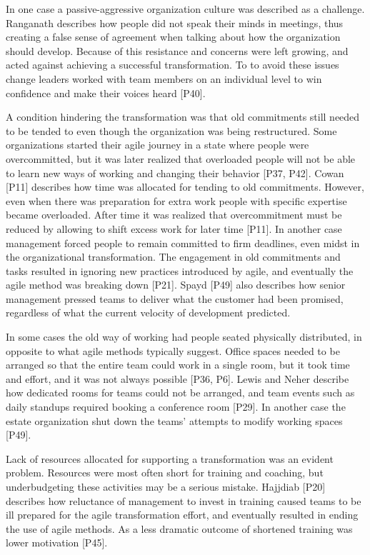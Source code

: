\documentclass[preprint,authoryear,12pt]{elsarticle}
\begin{document}
In one case a passive-aggressive organization culture was described as a
challenge. Ranganath describes how people did not speak their minds in meetings,
thus creating a false sense of agreement when talking about how the organization
should develop. Because of this resistance and concerns were left growing, and
acted against achieving a successful transformation. To to avoid these issues
change leaders worked with team members on an individual level to win confidence 
and make their voices heard [P40].


A condition hindering the transformation was that old commitments still needed
to be tended to even though the organization was being restructured.
Some organizations started their agile journey in a state where people were
overcommitted, but it was later realized that overloaded people will not be able
to learn new ways of working and changing their behavior [P37, P42]. Cowan [P11]
describes how time was allocated for tending to old commitments. However, even
when there was preparation for extra work people with specific expertise became
overloaded. After time it was realized that overcommitment must be reduced by
allowing to shift excess work for later time [P11]. In another case management
forced people to remain committed to firm deadlines, even midst in the
organizational transformation. The engagement in old commitments and tasks
resulted in ignoring new practices introduced by agile, and eventually the agile
method was breaking down [P21]. Spayd [P49] also describes how senior management 
pressed teams to deliver what the customer had been promised, regardless of what
the current velocity of development predicted.


In some cases the old way of working had people seated physically distributed,
in opposite to what agile methods typically suggest. Office spaces needed to be
arranged so that the entire team could work in a single room, but it took time
and effort, and it was not always possible [P36, P6]. Lewis and Neher describe
how dedicated rooms for teams could not be arranged, and team events such as
daily standups required booking a conference room [P29]. In another case the
estate organization shut down the teams' attempts to modify working spaces
[P49].


Lack of resources allocated for supporting a transformation was an evident
problem. Resources were most often short for training and coaching, but
underbudgeting these activities may be a serious mistake.
Hajjdiab [P20] describes how reluctance of management to invest in training
caused teams to be ill prepared for the agile transformation effort, and
eventually resulted in ending the use of agile methods. As a less dramatic
outcome of shortened training was lower motivation [P45].
\end{document}
